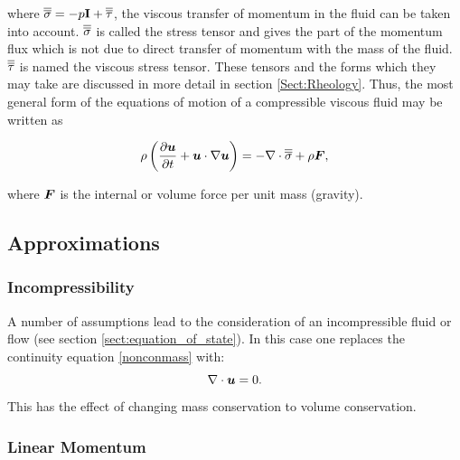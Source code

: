 where $\overline{\overline{\sigma}}=-p\mathbf{I}+\overline{\overline{\tau}}$, the viscous transfer of momentum in the fluid can be taken into account. $\overline{\overline{\sigma}}$ is called the stress tensor and gives the part of the momentum flux which is not due to direct transfer of momentum with the mass of the fluid. $\overline{\overline{\tau}}$ is named the viscous stress tensor. These tensors and the forms which they may take are discussed in more detail in section \ref{Sect:Rheology}. Thus, the most general form of the equations of motion of a compressible viscous fluid may be written as

\begin{equation}\label{viscous_fluids_1}
 \rho\left(\frac{\partial{\mbox{\boldmath$u$}}}{\partial{t}}+{\mbox{\boldmath$u$}}\cdot\nabla{\mbox{\boldmath$u$}}\right)=-\nabla\cdot\overline{\overline{\sigma}}+\rho{\mbox{\boldmath$F$}},
\end{equation}

where ${\mbox{\boldmath$F$}}$ is the internal or volume force per unit mass (\eg gravity).

\subsection{Approximations}

\subsubsection{Incompressibility} \label{sect:incompressibility}
A number of assumptions lead to the consideration of an incompressible fluid or flow (see section \ref{sect:equation_of_state}). In this case one replaces the continuity equation \eqref{nonconmass} with:
\begin{equation}\label{eq:divfree}
\nabla\cdot{\mbox{\boldmath$u$}}=0.
\end{equation}
This has the effect of changing mass conservation to volume conservation.

\subsubsection{Linear Momentum}


